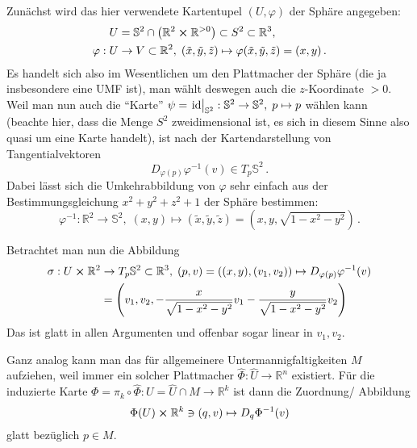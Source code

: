 \documentclass[../H_Analysis_main.tex]{subfiles}
\begin{document}
\begin{bsp}[Sphäre]
Zunächst wird das hier verwendete Kartentupel $(U, \varphi)$ der Sphäre angegeben:
\begin{align*}
U &= \mathbb{S}^2 \cap \qty(\mathbb{R}^2 \cross \mathbb{R}^{> 0}) \subset S^2 \subset \mathbb{R}^3,
\\
\varphi: U &\rightarrow V \subset \mathbb{R}^2, \; (\tilde{x}, \tilde{y}, \tilde{z}) \mapsto \varphi(\tilde{x}, \tilde{y}, \tilde{z}) = (x, y) \, .
\end{align*}
Es handelt sich also im Wesentlichen um den Plattmacher der Sphäre (die ja insbesondere eine UMF ist), man wählt deswegen auch die $z$-Koordinate $> 0$. Weil man nun auch die \enquote{Karte} $\psi = \eval{\text{id}}_{\mathbb{S}^2}: \mathbb{S}^2 \rightarrow \mathbb{S}^2, \; p \mapsto p$ wählen kann (beachte hier, dass die Menge $S^2$ zweidimensional ist, es sich in diesem Sinne also quasi um eine Karte handelt), ist nach der Kartendarstellung von Tangentialvektoren
\begin{equation}
D_{\varphi(p)} \varphi^{-1}(v) \in T_p \mathbb{S}^2 \, .
\end{equation}
Dabei lässt sich die Umkehrabbildung von $\varphi$ sehr einfach aus der Bestimmungsgleichung $x^2 + y^2 + z^2 + 1$ der Sphäre bestimmen:
\begin{equation}
\varphi^{-1}: \mathbb{R}^2 \rightarrow \mathbb{S}^2, \; (x, y) \mapsto (\tilde{x}, \tilde{y}, \tilde{z}) = (x, y, \sqrt{1 - x^2 - y^2}) \, .
\end{equation}

Betrachtet man nun die Abbildung
\begin{equation}\label{eq:abbtangraumsph}
\begin{split}
\sigma: U \cross \mathbb{R}^2 &\rightarrow T_p \mathbb{S}^2 \subset \mathbb{R}^3, \; (p, v) = \qty((x, y), (v_1, v_2)) \mapsto D_{\varphi(p)} \varphi^{-1}(v)
\\
&= \qty(v_1, v_2, -\frac{x}{\sqrt{1 - x^2 - y^2}} v_1 - \frac{y}{\sqrt{1 - x^2 - y^2}} v_2)
\end{split}
\end{equation}
Das ist glatt in allen Argumenten und offenbar sogar linear in $v_1, v_2$.
\end{bsp}

Ganz analog kann man das für allgemeinere Untermannigfaltigkeiten $M$ aufziehen, weil immer ein solcher Plattmacher $\hat{\Phi}: \hat{U} \rightarrow \mathbb{R}^n$ existiert. Für die induzierte Karte $\Phi = \pi_k \circ \hat{\Phi}: U = \hat{U} \cap M \rightarrow \mathbb{R}^k$ ist dann die Zuordnung/ Abbildung
\begin{equation}
\Phi(U) \cross \mathbb{R}^k \ni \qty(q, v) \mapsto D_q \Phi^{-1}(v)
\end{equation}
glatt bezüglich $p \in M$.
\end{document}
